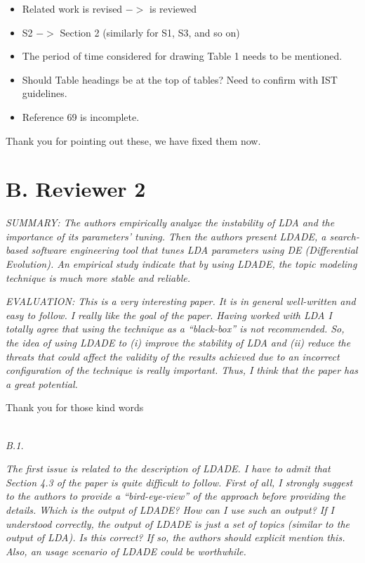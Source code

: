 \documentclass[twocolumn,5p,sort&compress]{elsarticle}
\newcommand{\bi}{\begin{itemize}}
\newcommand{\ei}{\end{itemize}}
\theoremstyle{break}
\begin{document}
{\em \bi
\item Related work is revised $->$ is reviewed
\item S2 $->$ Section 2 (similarly for S1, S3, and so on)
\item The period of time considered for drawing Table 1 needs to be mentioned. 
\item Should Table headings be at the top of tables? Need to confirm with IST guidelines.
\item Reference 69 is incomplete.\\
\ei}

Thank you for pointing out these, we have fixed them now.

\newpage
\section*{B. Reviewer 2}

\textit{SUMMARY: The authors empirically analyze the instability of LDA and the importance of its parameters' tuning. Then the authors present LDADE, a search-based software engineering tool that tunes LDA parameters using DE (Differential Evolution). An empirical study indicate that by using LDADE, the topic modeling technique is much more stable and reliable.}

\textit{EVALUATION: This is a very interesting paper. It is in general well-written and easy to follow. I really like the goal of the paper. Having worked with LDA I totally agree that using the technique as a ``black-box'' is not recommended. So, the idea of using LDADE to (i) improve the stability of LDA and (ii) reduce the threats that could affect the validity of the results achieved due to an incorrect configuration of the technique is really important. Thus, I think that the paper has a great potential.\\} 

Thank you for those kind words

\noindent
\textit{\\B.1.} 

\textit{The first issue is related to the description of LDADE. I have to admit that Section 4.3 of the paper is quite difficult to follow. First of all, I strongly suggest to the authors to provide a ``bird-eye-view'' of the approach before providing the details. Which is the output of LDADE? How can I use such an output? If I understood correctly, the output of LDADE is just a set of topics (similar to the output of LDA). Is this correct? If so, the authors should explicit mention this. Also, an usage scenario of LDADE could be worthwhile.\\}
\end{document}
